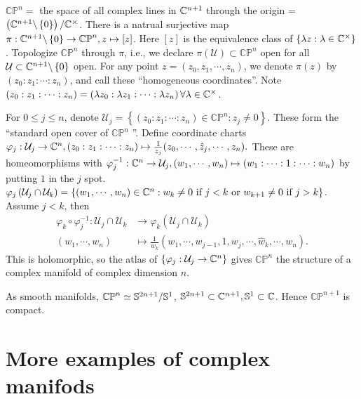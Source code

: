 \begin{example}
  $\mathbb{CP}^{n}=$ the space of all complex lines in $\mathbb{C}^{n+1}$ through the origin = $\left( \mathbb{C}^{n+1}\backslash \left\{0\right\}  \right) / \mathbb{C}^{\times }$. There is a natrual surjective map $\pi:\mathbb{C}^{n+1}\backslash  \left\{0\right\} \to \mathbb{CP}^{n}, z\mapsto [z]$. Here $[z]$ is the equivalence class of $\left\{\lambda z:\lambda \in \mathbb{C}^{\times }\right\} $. Topologize $\mathbb{CP}^{n}$ through $\pi$, i.e., we declare $\pi(\mathcal{U})\subset \mathbb{CP}^{n}$ open for all $\mathcal{U}\subset \mathbb{C}^{n+1}\backslash \left\{0\right\} $ open. For any point $z=\left( z_0,z_1,\cdots ,z_n \right) $, we denote $\pi(z)$ by $(z_0:z_1:\cdots :z_n)$, and call these ``homogeneous coordinates''. Note $(z_0:z_1:\cdots :z_n)=\left( \lambda z_0:\lambda z_1:\cdots :\lambda z_n \right) \forall \lambda \in  \mathbb{C}^{\times }$.

  For $0\le j\le n$, denote $\mathcal{U}_j=\left\{\left( z_0:z_1:\cdots :z_n \right) \in \mathbb{CP}^{n}:z_j\neq 0\right\} $. These form the ``standard open cover of $\mathbb{CP}^{n}$ ''. Define coordinate charts $\varphi_j:\mathcal{U}_j\to \mathbb{C}^{n},(z_0:z_1:\cdots :z_n)\mapsto \frac{1}{z_j}(z_0,\cdots ,\hat{z}_j,\cdots ,z_n).$ These are homeomorphisms with $\varphi_j^{-1}:\mathbb{C}^{n}\to \mathcal{U}_j, (w_1,\cdots ,w_n)\mapsto (w_1:\cdots :1:\cdots :w_n)$ by putting  $1$ in the $j$ spot.
  $\varphi_j\left( \mathcal{U}_j\cap \mathcal{U}_k \right) =\left\{(w_1,\cdots ,w_n) \in \mathbb{C}^{n}: w_k\neq 0 \text{ if }j<k \text{ or } w_{k+1}\neq 0 \text{ if }j>k\right\} $. Assume $j<k$, then 
  \begin{align*}
    \varphi_k\circ \varphi_j^{-1}: \mathcal{U}_j\cap \mathcal{U}_k &\longrightarrow \varphi_k(\mathcal{U}_j\cap \mathcal{U}_k) \\
    (w_1,\cdots ,w_n) &\longmapsto  \frac{1}{w_k}\left( w_1,\cdots ,w_{j-1},1,w_j,\cdots ,\widehat{w}_k,\cdots ,w_n \right) 			
  .\end{align*}
  This is holomorphic, so the atlas of $\left\{\varphi_j:\mathcal{U}_j\to \mathbb{C}^{n}\right\} $ gives $\mathbb{CP}^{n}$ the structure of a complex manifold of complex dimension $n$.

  As smooth manifolds, $\mathbb{CP}^{n}\simeq \mathbb{S}^{2n+1} /\mathbb{S}^1$, $\mathbb{S}^{2n+1}\subset \mathbb{C}^{n+1},\mathbb{S}^{1}\subset \mathbb{C}$.
  Hence $\mathbb{CP}^{n+1}$ is compact.
\end{example}

\section{More examples of complex manifods}

